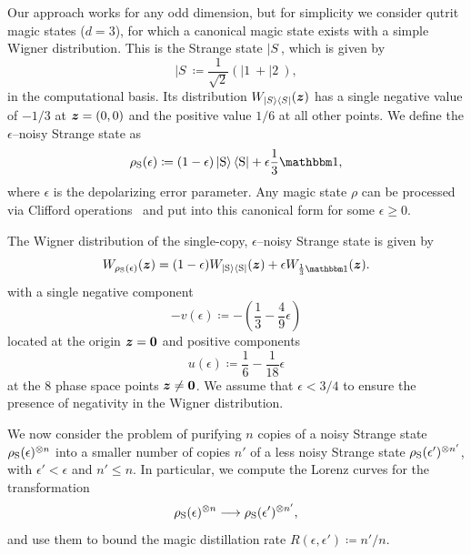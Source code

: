 \documentclass[pra,
aps,
twocolumn,
superscriptaddress,
groupedaddress,
nofootinbib,
reprint
]{revtex4-1}
\begin{document}
Our approach works for any odd dimension, but for simplicity we consider qutrit magic states ($d=3$), for which a canonical magic state exists with a simple Wigner distribution. This is the Strange state $|S\>$, which is given by
\begin{equation}
|S\> \coloneqq \frac{1}{\sqrt{2}} (|1\> + |2\>),
\end{equation}
in the computational basis. Its distribution $W_{|S\rangle\langle S|}(\boldsymbol{z})$ has a single negative value of $-1/3$ at $\bm{z} =(0,0)$ and the positive value $1/6$ at all other points. We define the $\epsilon$--noisy Strange state as
\begin{equation}\label{eq:noisysn}
    \rho_{\rm{S}}(\epsilon)\coloneqq (1 - \epsilon) \ket{\rm{S}}\bra{\rm{S}} + \epsilon \frac{1}{3}\id,
\end{equation}
where $\epsilon$ is the depolarizing error parameter. Any magic state $\rho$ can be processed via Clifford operations~\cite{cit:prakash,cit:prakash2} and put into this canonical form for some $\epsilon \ge 0$.

The Wigner distribution of the single-copy, $\epsilon$--noisy Strange state  is given by
\begin{equation}
	\W[\bmz]{\rho_{\rm{S}}(\epsilon)} = (1-\epsilon)\W[\bmz]{|\rm{S}\>\<\rm{S}|} + \epsilon\W[\bmz]{\frac{1}{3}\id}.
\end{equation}
with a single negative component
\begin{equation}
	- v(\epsilon) \coloneqq - \left( \frac{1}{3} -\frac{4}{9}\epsilon \right)
\end{equation} 
located at the origin $\bm{z} = \bm{0}$ and positive components
\begin{equation}
	u(\epsilon) \coloneqq \frac{1}{6} -\frac{1}{18}\epsilon
\end{equation}
at the 8 phase space points $\bm{z} \ne \mathbf{0}$. We assume that $\epsilon < 3/4$ to ensure the presence of negativity in the Wigner distribution. 

We now consider the problem of purifying $n$ copies of a noisy Strange state $\rho_{\rm{S}}(\epsilon)^{\otimes n}$ into a smaller number of copies $n'$ of a less noisy Strange state $\rho_{\rm{S}}(\epsilon')^{\otimes n'}$, with $\epsilon' < \epsilon$ and $n' \leq n$. In particular, we compute the Lorenz curves for the transformation
\begin{equation}\label{eq:sudist}
	\rho_{\rm{S}}(\epsilon)^{\otimes n} \longrightarrow \rho_{\rm{S}}(\epsilon')^{\otimes n'}, %
\end{equation}
and use them to bound the magic distillation rate $R(\epsilon, \epsilon') \coloneqq n'/n$.
\end{document}
